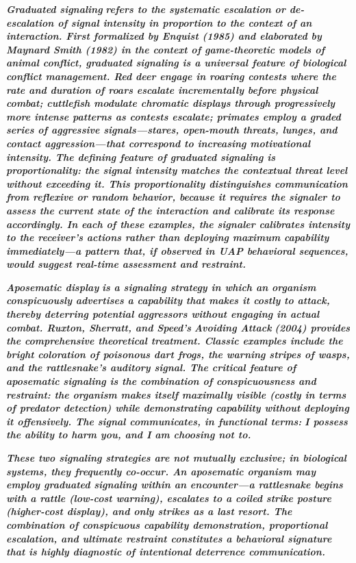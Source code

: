 \documentclass[11pt,letterpaper]{article}
\begin{document}
\textbf{\textit{Graduated signaling}}\textbf{\textit{ refers to the systematic escalation or de-escalation of signal intensity in proportion to the context of an interaction. First formalized by Enquist (1985) and elaborated by Maynard Smith (1982) in the context of game-theoretic models of animal conflict, graduated signaling is a universal feature of biological conflict management. Red deer engage in roaring contests where the rate and duration of roars escalate incrementally before physical combat; cuttlefish modulate chromatic displays through progressively more intense patterns as contests escalate; primates employ a graded series of aggressive signals---stares, open-mouth threats, lunges, and contact aggression---that correspond to increasing motivational intensity. The defining feature of graduated signaling is proportionality: the signal intensity matches the contextual threat level without exceeding it. This proportionality distinguishes communication from reflexive or random behavior, because it requires the signaler to assess the current state of the interaction and calibrate its response accordingly. In each of these examples, the signaler calibrates intensity to the receiver's actions rather than deploying maximum capability immediately---a pattern that, if observed in UAP behavioral sequences, would suggest real-time assessment and restraint.}}


\textbf{\textit{Aposematic display}}\textbf{\textit{ is a signaling strategy in which an organism conspicuously advertises a capability that makes it costly to attack, thereby deterring potential aggressors without engaging in actual combat. Ruxton, Sherratt, and Speed's }}\textbf{\textit{Avoiding Attack}}\textbf{\textit{ (2004) provides the comprehensive theoretical treatment. Classic examples include the bright coloration of poisonous dart frogs, the warning stripes of wasps, and the rattlesnake's auditory signal. The critical feature of aposematic signaling is the combination of conspicuousness and restraint: the organism makes itself maximally visible (costly in terms of predator detection) while demonstrating capability without deploying it offensively. The signal communicates, in functional terms: }}\textbf{\textit{I possess the ability to harm you, and I am choosing not to.}}


\textbf{\textit{These two signaling strategies are not mutually exclusive; in biological systems, they frequently co-occur. An aposematic organism may employ graduated signaling within an encounter---a rattlesnake begins with a rattle (low-cost warning), escalates to a coiled strike posture (higher-cost display), and only strikes as a last resort. The combination of conspicuous capability demonstration, proportional escalation, and ultimate restraint constitutes a behavioral signature that is highly diagnostic of intentional deterrence communication.}}
\end{document}
